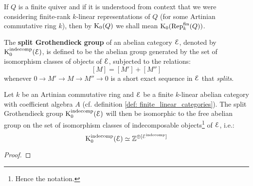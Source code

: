             \begin{convention}
                If $Q$ is a finite quiver and if it is understood from context that we were considering finite-rank $k$-linear representations of $Q$ (for some Artinian commutative ring $k$), then by $\mathrm{K}_0(Q)$ we shall mean $\mathrm{K}_0(\mathrm{Rep}_k^{\mathrm{fin}}(Q))$.
            \end{convention}
            
            \begin{definition} \label{def: split_grothendieck_groups}
                The \textbf{split Grothendieck group} of an abelian category $\mathcal{E}$, denoted by $\mathrm{K}_0^{\mathrm{indecomp}}(\mathcal{E})$, is defined to be the abelian group generated by the set of isomorphism classes of objects of $\mathcal{E}$, subjected to the relations:
                    $$[M] = [M'] + [M'']$$
                whenever $0 \to M' \to M \to M'' \to 0$ is a short exact sequence in $\mathcal{E}$ that \textit{splits}.
            \end{definition}
            \begin{proposition} \label{prop: split_grothendieck_groups_of_finite_linear_abelian_categories_are_free_on_indecomposable_objects} 
                Let $k$ be an Artinian commutative ring and $\mathcal{E}$ be a finite $k$-linear abelian category with coefficient algebra $A$ (cf. definition \ref{def: finite_linear_categories}). The split Grothendieck group $\mathrm{K}_0^{\mathrm{indecomp}}(\mathcal{E})$ will then be isomorphic to the free abelian group on the set of isomorphism classes of indecomposable objects\footnote{Hence the notation.} of $\mathcal{E}$, i.e.:
                    $$\mathrm{K}_0^{\mathrm{indecomp}}(\mathcal{E}) \simeq \mathbb{Z}^{\oplus [\mathcal{E}^{\mathrm{indecomp}}]}$$
            \end{proposition}
                \begin{proof}
                    
                \end{proof}
